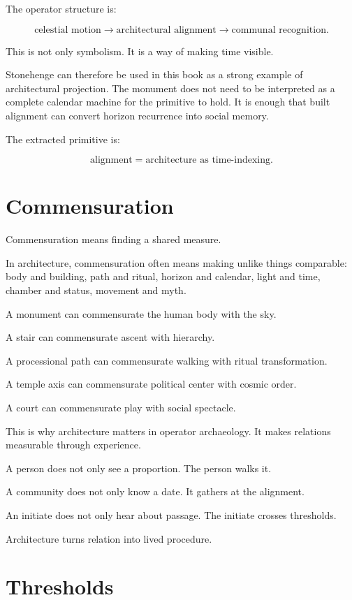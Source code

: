 \documentclass[11pt]{book}
\begin{document}
The operator structure is:

\[
\text{celestial motion}
\rightarrow
\text{architectural alignment}
\rightarrow
\text{communal recognition}.
\]

This is not only symbolism. It is a way of making time visible.

Stonehenge can therefore be used in this book as a strong example of architectural projection. The monument does not need to be interpreted as a complete calendar machine for the primitive to hold. It is enough that built alignment can convert horizon recurrence into social memory.

The extracted primitive is:

\[
\text{alignment} = \text{architecture as time-indexing}.
\]

\section{Commensuration}

Commensuration means finding a shared measure.

In architecture, commensuration often means making unlike things comparable: body and building, path and ritual, horizon and calendar, light and time, chamber and status, movement and myth.

A monument can commensurate the human body with the sky.

A stair can commensurate ascent with hierarchy.

A processional path can commensurate walking with ritual transformation.

A temple axis can commensurate political center with cosmic order.

A court can commensurate play with social spectacle.

This is why architecture matters in operator archaeology. It makes relations measurable through experience.

A person does not only see a proportion. The person walks it.

A community does not only know a date. It gathers at the alignment.

An initiate does not only hear about passage. The initiate crosses thresholds.

Architecture turns relation into lived procedure.

\section{Thresholds}
\end{document}
